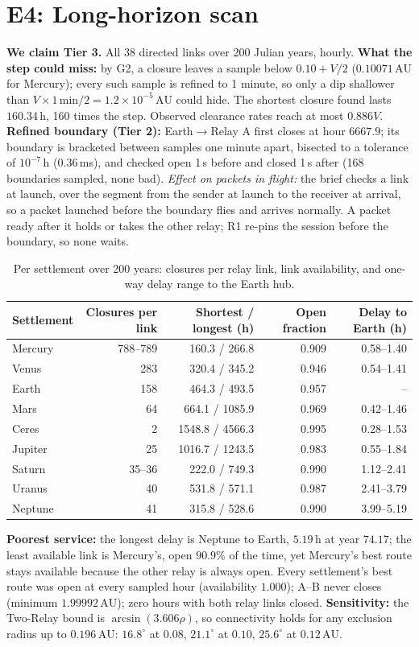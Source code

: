 \documentclass[11pt]{article}
\theoremstyle{definition}
\theoremstyle{remark}
\newcommand{\AU}{\,\mathrm{AU}}
\newcommand{\h}{\,\mathrm{h}}
\begin{document}
\section{E4: Long-horizon scan}\label{app:e4}
\textbf{We claim Tier 3.} All 38 directed links over 200 Julian years, hourly. \textbf{What the step could miss:} by G2, a closure leaves a sample below $0.10+V/2$ ($0.10071\AU$ for Mercury); every such sample is refined to 1 minute, so only a dip shallower than $V\times1\,\mathrm{min}/2 = 1.2\times10^{-5}\AU$ could hide. The shortest closure found lasts $160.34\h$, 160 times the step. Observed clearance rates reach at most $0.886V$. \textbf{Refined boundary (Tier 2):} Earth$\to$Relay A first closes at hour $6667.9$; its boundary is bracketed between samples one minute apart, bisected to a tolerance of $10^{-7}\h$ (0.36\,ms), and checked open 1\,s before and closed 1\,s after (168 boundaries sampled, none bad). \emph{Effect on packets in flight:} the brief checks a link at launch, over the segment from the sender at launch to the receiver at arrival, so a packet launched before the boundary flies and arrives normally. A packet ready after it holds or takes the other relay; R1 re-pins the session before the boundary, so none waits.
\begin{table}[H]
\centering
\caption{Per settlement over 200 years: closures per relay link, link availability, and one-way delay range to the Earth hub.}
\small
\begin{tabular}{@{}lrrrr@{}}
\toprule
Settlement & Closures per link & Shortest / longest (h) & Open fraction & Delay to Earth (h) \\
\midrule
Mercury & 788--789 & 160.3 / 266.8 & 0.909 & 0.58--1.40 \\
Venus & 283 & 320.4 / 345.2 & 0.946 & 0.54--1.41 \\
Earth & 158 & 464.3 / 493.5 & 0.957 & -- \\
Mars & 64 & 664.1 / 1085.9 & 0.969 & 0.42--1.46 \\
Ceres & 2 & 1548.8 / 4566.3 & 0.995 & 0.28--1.53 \\
Jupiter & 25 & 1016.7 / 1243.5 & 0.983 & 0.55--1.84 \\
Saturn & 35--36 & 222.0 / 749.3 & 0.990 & 1.12--2.41 \\
Uranus & 40 & 531.8 / 571.1 & 0.987 & 2.41--3.79 \\
Neptune & 41 & 315.8 / 528.6 & 0.990 & 3.99--5.19 \\
\bottomrule
\end{tabular}
\end{table}
\textbf{Poorest service:} the longest delay is Neptune to Earth, $5.19\h$ at year $74.17$; the least available link is Mercury's, open $90.9\%$ of the time, yet Mercury's best route stays available because the other relay is always open. Every settlement's best route was open at every sampled hour (availability $1.000$); A--B never closes (minimum $1.99992\AU$); zero hours with both relay links closed. \textbf{Sensitivity:} the Two-Relay bound is $\arcsin(3.606\rho)$, so connectivity holds for any exclusion radius up to $0.196\AU$: $16.8^\circ$ at $0.08$, $21.1^\circ$ at $0.10$, $25.6^\circ$ at $0.12\AU$.
\end{document}
